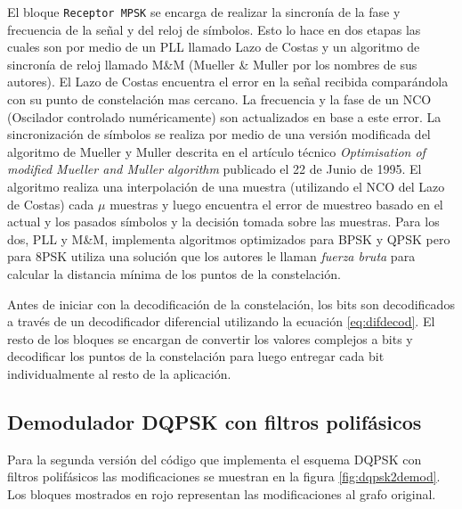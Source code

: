 El bloque \verb|Receptor MPSK| se encarga de realizar la sincron\'ia de la fase y frecuencia de la se\~nal y del reloj de
s\'imbolos. Esto lo hace en dos etapas las cuales son por medio de un PLL llamado Lazo de Costas y un algoritmo de sincron\'ia de
reloj llamado M\&M (Mueller \& Muller por los nombres de sus autores). El Lazo de Costas encuentra el error en la se\~nal recibida
compar\'andola con su punto de constelaci\'on mas cercano. La frecuencia y la fase de un NCO (Oscilador controlado
num\'ericamente) son actualizados en base a este error. La sincronizaci\'on de s\'imbolos se realiza por medio de una versi\'on
modificada del algoritmo de Mueller y Muller descrita en el art\'iculo t\'ecnico \emph{Optimisation of modified Mueller and Muller
algorithm} publicado el 22 de Junio de 1995. El algoritmo realiza una interpolaci\'on de una muestra (utilizando el NCO del Lazo
de Costas) cada $\mu$ muestras y luego encuentra el error de muestreo basado en el actual y los pasados s\'imbolos y la decisi\'on
tomada sobre las muestras. Para los dos, PLL y M\&M, \gnuradio implementa algoritmos optimizados para BPSK y QPSK pero para 8PSK
utiliza una soluci\'on que los autores le llaman \emph{fuerza bruta} para calcular la distancia m\'inima de los puntos de la
constelaci\'on.

Antes de iniciar con la decodificaci\'on de la constelaci\'on, los bits son decodificados a trav\'es de un decodificador
diferencial utilizando la ecuaci\'on \eqref{eq:difdecod}. El resto de los bloques se encargan de convertir los valores
complejos a bits y decodificar los puntos de la constelaci\'on para luego entregar cada bit individualmente al resto de la aplicaci\'on. 

\subsection{Demodulador DQPSK con filtros polif\'asicos}

Para la segunda versi\'on del c\'odigo que implementa el esquema DQPSK con filtros polif\'asicos las modificaciones se
muestran en la figura \ref{fig:dqpsk2demod}. Los bloques mostrados en rojo representan las modificaciones al grafo original.

